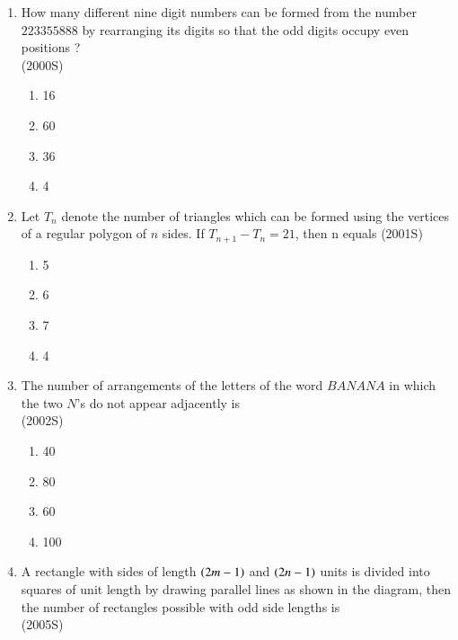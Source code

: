 \documentclass[journal,12pt,twocolumn]{IEEEtran}
\theoremstyle{remark}
\begin{document}
\begin{enumerate}[start=3]
\begin{multicols}{2}
\begin{enumerate}
\end{enumerate}
\end{multicols}
\item How many different nine digit numbers can be formed from the number $223355888$ by rearranging its digits so that the odd digits occupy even positions ?\\
\hspace*{\fill}(2000S)\\
\begin{multicols}{2} 
\begin{enumerate}
\item16 \item 60\columnbreak\item 36\item 4
\end{enumerate}
\end{multicols}
\item Let $T_n$ denote the number of triangles which can be formed using the vertices of a regular polygon of $n$ sides. If $T_{n+1}-T_n=21$, then n equals
\hfill{(2001S)}\\
\begin{multicols}{2} 
\begin{enumerate}
\item 5\item 6\columnbreak\item  7\item  4
\end{enumerate}
\end{multicols}
\item The number of arrangements of the letters of the word $BANANA$ in which the two $N$'s do not appear adjacently is\\
\hspace*{\fill}(2002S)
\begin{multicols}{2} 
\begin{enumerate}
\item  40\item 80\columnbreak\item  60\item  100
\end{enumerate}
\end{multicols}
\item A rectangle with sides of length $\left(2m-1\right)$ and $\left(2n-1\right)$ units is divided into squares of unit length by drawing parallel lines as shown in the diagram, then the number of rectangles possible with odd side lengths is\\
\hspace*{\fill}(2005S)

\end{enumerate}
\end{document}

